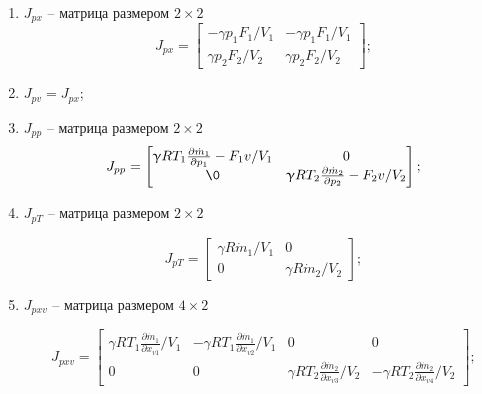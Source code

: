 \begin{enumerate}
    \item $J_{px}$ -- матрица размером $2 \times 2$
          \begin{equation*}
              J_{px} = \begin{bmatrix}
                  -\gamma p_1 F_1 / V_1 & -\gamma p_1 F_1 / V_1 \\
                  \gamma p_2 F_2 / V_2  & \gamma p_2 F_2 / V_2
              \end{bmatrix};
          \end{equation*}

    \item $J_{pv} = J_{px}$;

    \item $J_{pp}$ -- матрица размером $2 \times 2$
          \begin{equation*}
              J_{pp} = \begin{bmatrix}
                  \gamma R T_1 \frac{\partial \dot{m}_1}{\partial p_1} - F_1 v / V_1 & 0                                                                  \\
                  \0                                                                 & \gamma R T_2 \frac{\partial \dot{m}_2}{\partial p_2} - F_2 v / V_2
              \end{bmatrix};
          \end{equation*}

    \item $J_{pT}$ -- матрица размером $2 \times 2$

          \begin{equation*}
              J_{pT} = \begin{bmatrix}
                  \gamma R \dot{m}_1 / V_1 & 0                        \\
                  0                        & \gamma R \dot{m}_2 / V_2
              \end{bmatrix};
          \end{equation*}

    \item $J_{pxv}$ -- матрица размером $4 \times 2$

          \begin{equation*}
              J_{pxv} = \begin{bmatrix}
                  \gamma R T_1 \frac{\partial \dot{m}_1}{\partial x_{v1}}/V_1 & -\gamma R T_1 \frac{\partial \dot{m}_1}{\partial x_{v2}}/V_1 & 0                                                           & 0                                                            \\
                  0                                                           & 0                                                            & \gamma R T_2 \frac{\partial \dot{m}_2}{\partial x_{v3}}/V_2 & -\gamma R T_2 \frac{\partial \dot{m}_2}{\partial x_{v4}}/V_2
              \end{bmatrix};
          \end{equation*}


\end{enumerate}
